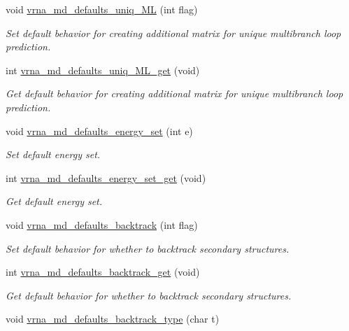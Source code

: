 \begin{DoxyCompactItemize}
void \hyperlink{group__model__details_ga59b944f61c5d2babec2d4c48c820de67}{vrna\+\_\+md\+\_\+defaults\+\_\+uniq\+\_\+\+ML} (int flag)
\begin{DoxyCompactList}\small\item\em Set default behavior for creating additional matrix for unique multibranch loop prediction. \end{DoxyCompactList}\item 
int \hyperlink{group__model__details_gab48e70fd024bf838404bcbcca0c874a0}{vrna\+\_\+md\+\_\+defaults\+\_\+uniq\+\_\+\+M\+L\+\_\+get} (void)
\begin{DoxyCompactList}\small\item\em Get default behavior for creating additional matrix for unique multibranch loop prediction. \end{DoxyCompactList}\item 
void \hyperlink{group__model__details_ga8dd29c55787a4576277e1907e92d810c}{vrna\+\_\+md\+\_\+defaults\+\_\+energy\+\_\+set} (int e)
\begin{DoxyCompactList}\small\item\em Set default energy set. \end{DoxyCompactList}\item 
int \hyperlink{group__model__details_ga017ed6afb1cba2b7f242412cab618b53}{vrna\+\_\+md\+\_\+defaults\+\_\+energy\+\_\+set\+\_\+get} (void)
\begin{DoxyCompactList}\small\item\em Get default energy set. \end{DoxyCompactList}\item 
void \hyperlink{group__model__details_ga978c468b2fe96a70d5191e3dd17d5599}{vrna\+\_\+md\+\_\+defaults\+\_\+backtrack} (int flag)
\begin{DoxyCompactList}\small\item\em Set default behavior for whether to backtrack secondary structures. \end{DoxyCompactList}\item 
int \hyperlink{group__model__details_ga90da1156e6883ddd68527c2830706648}{vrna\+\_\+md\+\_\+defaults\+\_\+backtrack\+\_\+get} (void)
\begin{DoxyCompactList}\small\item\em Get default behavior for whether to backtrack secondary structures. \end{DoxyCompactList}\item 
void \hyperlink{group__model__details_ga68305274de96b56b7799575e222560d8}{vrna\+\_\+md\+\_\+defaults\+\_\+backtrack\+\_\+type} (char t)

\end{DoxyCompactItemize}
